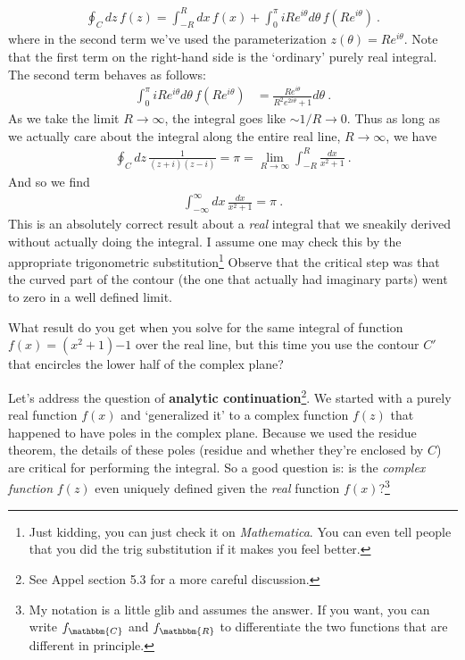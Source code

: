 \begin{example}
\begin{align}
	\oint_C dz\, f(z) = \int_{-R}^R dx\, f(x) 
	+ \int_0^\pi iR e^{i\theta} d\theta  \, f\left(Re^{i\theta}\right) \ .
\end{align}
where in the second term we've used the parameterization $z(\theta) = Re^{i\theta}$. Note that the first term on the right-hand side is the `ordinary' purely real integral. The second term behaves as follows:
\begin{align}
	\int_0^\pi iR e^{i\theta} d\theta  \, f\left(Re^{i\theta}\right)
	&= 
	\frac{Re^{i\theta}}{R^2 e^{2i\theta}+1} d\theta \ .
\end{align}
As we take the limit $R\to\infty$, the integral goes like $\sim 1/R \to 0$. Thus as long as we actually care about the integral along the entire real line, $R\to \infty$, we have
\begin{align}
	\oint_Cdz\, \frac{1}{(z+i)(z-i)}  
	= \pi 
	= \lim_{R\to\infty} \int_{-R}^R \frac{dx}{x^2+1} \ .
\end{align}
And so we find
\begin{align}
	\int_{-\infty}^\infty dx \, 
	\frac{dx}{x^2+1}
	= \pi \ .
\end{align}
This is an absolutely correct result about a \emph{real} integral that we sneakily derived without actually doing the integral. I assume one may check this by the appropriate trigonometric substitution\footnote{Just kidding, you can just check it on \emph{Mathematica}. You can even tell people that you did the trig substitution if it makes you feel better.} Observe that the critical step was that the curved part of the contour (the one that actually had imaginary parts) went to zero in a well defined limit. 
\end{example}
\begin{exercise}
What result do you get when you solve for the same integral of function $f(x)=(x^2+1){-1}$ over the real line, but this time you use the contour $C'$ that encircles the lower half of the complex plane?
\end{exercise}
Let's address the question of \textbf{analytic continuation}\footnote{See Appel section 5.3 for a more careful discussion.}. We started with a purely real function $f(x)$ and `generalized it' to a complex function $f(z)$ that happened to have poles in the complex plane. Because we used the residue theorem, the details of these poles (residue and whether they're enclosed by $C$) are critical for performing the integral. So a good question is: is the \emph{complex function} $f(z)$ even uniquely defined given the \emph{real} function $f(x)$?\footnote{My notation is a little glib and assumes the answer. If you want, you can write $f_\mathbbm{C}$ and $f_\mathbbm{R}$ to differentiate the two functions that are different in principle.}
